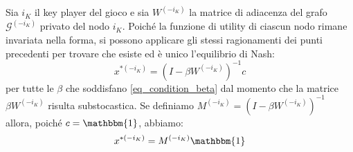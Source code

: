 \begin{alphaparts}
    \questionpart
    Sia \(i_K\) il key player del gioco e sia \(W^{(- i_K)}\) la matrice di adiacenza del grafo \(\mathcal{G}^{(- i_K)}\) privato del nodo \(i_K\). Poiché la funzione di utility di ciascun nodo rimane invariata nella forma, si possono applicare gli stessi ragionamenti dei punti precedenti per trovare che esiste ed è unico l'equilibrio di Nash:
    \[
    x^{*(- i_K)} = (I- \beta W^{(- i_K)})^{- 1}c  
    \]
    per tutte le \(\beta\) che soddisfano \ref{eq_condition_beta} dal momento che la matrice \(\beta W^{(- i_K)}\) risulta substocastica. Se definiamo \(M^{(- i_K)} = (I- \beta W^{(- i_K)})^{- 1}\) allora, poiché \(c= \mathbbm{1}\), abbiamo: 
    \begin{equation}    
            x^{*(- i_K)} = M^{(- i_K)} \mathbbm{1}
    \end{equation}
    
    
\end{alphaparts}